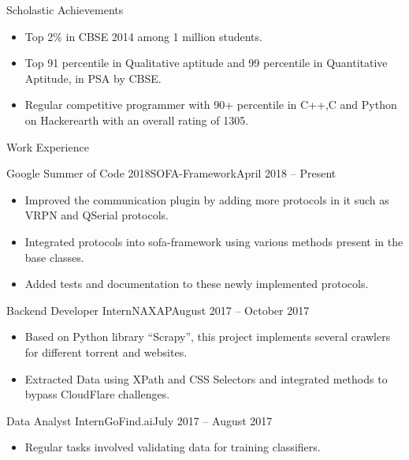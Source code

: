 \documentclass[]{mcdowellcv}
\begin{document}
	\begin{cvsection}{Scholastic Achievements}{}{}
	    \begin{cvsubsection}{}{}{}
			\begin{itemize}
				\item Top 2\% in CBSE 2014 among 1 million students.
				\item Top 91 percentile in Qualitative aptitude and 99 percentile in Quantitative Aptitude, in PSA by CBSE.
                \item Regular competitive programmer with 90+ percentile in C++,C and Python on Hackerearth with an overall rating of 1305.
			\end{itemize}
		\end{cvsubsection}
	\end{cvsection}
	\begin{cvsection}{Work Experience}
	    \begin{cvsubsection}{Google Summer of Code 2018}{SOFA-Framework}{April 2018 -- Present}
			\begin{itemize}
				\item Improved the communication plugin by adding more protocols in it such as VRPN and QSerial protocols.
				\item Integrated protocols into sofa-framework using various methods present in the base classes.
				\item Added tests and documentation to these newly implemented protocols.
	   			\end{itemize}
		\end{cvsubsection}
		
		\begin{cvsubsection}{Backend Developer Intern}{NAXAP}{August 2017 -- October 2017}
			\begin{itemize}
				\item Based on Python library “Scrapy”, this project implements several crawlers for different torrent and websites.
	   			\item Extracted Data using XPath and CSS Selectors and integrated methods to bypass CloudFlare challenges.
	   			\end{itemize}
		\end{cvsubsection}
		
		\begin{cvsubsection}{Data Analyst Intern}{GoFind.ai}{July 2017 -- August 2017}
			\begin{itemize}
				\item Regular tasks involved validating data for training classifiers.
				\end{itemize}
		\end{cvsubsection}
	\end{cvsection}
	
\end{document}
